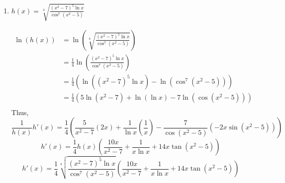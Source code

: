 \documentclass[nooutcomes]{ximera}
\begin{document}
\begin{problem}
\begin{enumerate}
		
		
	\item  $h(x) = \sqrt[4]{\frac{(x^2 - 7)^5 \ln x}{\cos^7(x^2 - 5)}}$
		\begin{freeResponse}
		\begin{align*}
		\ln (h(x)) &= \ln \left( \sqrt[4]{\frac{(x^2 - 7)^5 \ln x}{\cos^7(x^2 - 5)}} \right) \\
		&= \frac{1}{4} \ln \left( \frac{(x^2 - 7)^5 \ln x}{\cos^7(x^2 - 5)} \right) \\
		&= \frac{1}{4} \left( \ln \left( (x^2 - 7)^5 \ln x \right) - \ln \left( \cos^7(x^2 - 5) \right) \right) \\
		&= \frac{1}{4} \left( 5\ln (x^2 - 7) + \ln (\ln x) - 7 \ln (\cos (x^2 -5)) \right) \\
		\end{align*}
		Thus,
		$$\frac{1}{h(x)} h'(x) = \frac{1}{4} \left( \frac{5}{x^2 - 7}(2x) + \frac{1}{\ln x} \left( \frac{1}{x} \right) - \frac{7}{\cos(x^2-5)}(-2x \sin(x^2-5)) \right)$$
		$$h'(x) = \frac{1}{4} h(x) \left( \frac{10x}{x^2 - 7} + \frac{1}{x \ln x} + 14x \tan(x^2 - 5) \right) $$
		$$ h'(x) = \frac{1}{4} \sqrt[4]{\frac{(x^2 - 7)^5 \ln x}{\cos^7(x^2 - 5)}} \left( \frac{10x}{x^2 - 7} + \frac{1}{x \ln x} + 14x \tan(x^2 - 5) \right) $$
		\end{freeResponse}
		
		
		
	\end{enumerate}
		
		
\end{problem}
\end{document}

